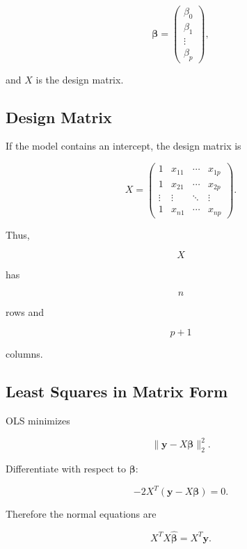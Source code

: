 \[
\boldsymbol{\beta}
=
\begin{pmatrix}
\beta_0\\
\beta_1\\
\vdots\\
\beta_p
\end{pmatrix},
\]

and \(X\) is the design matrix.

\subsection{Design Matrix}
\label{subsec:design-matrix-regression}

If the model contains an intercept, the design matrix is

\[
\boxed{
X
=
\begin{pmatrix}
1 & x_{11} & \cdots & x_{1p}\\
1 & x_{21} & \cdots & x_{2p}\\
\vdots & \vdots & \ddots & \vdots\\
1 & x_{n1} & \cdots & x_{np}
\end{pmatrix}.
}
\]

Thus,

\[
X
\]

has

\[
n
\]

rows and

\[
p+1
\]

columns.

\subsection{Least Squares in Matrix Form}
\label{subsec:least-squares-matrix}

OLS minimizes

\[
\boxed{
\|\mathbf{y}-X\boldsymbol{\beta}\|_2^2.
}
\]

Differentiate with respect to \(\boldsymbol{\beta}\):

\[
-2X^T
(
\mathbf{y}
-
X\boldsymbol{\beta}
)
=
0.
\]

Therefore the normal equations are

\[
\boxed{
X^TX
\widehat{\boldsymbol{\beta}}
=
X^T\mathbf{y}.
}
\]


